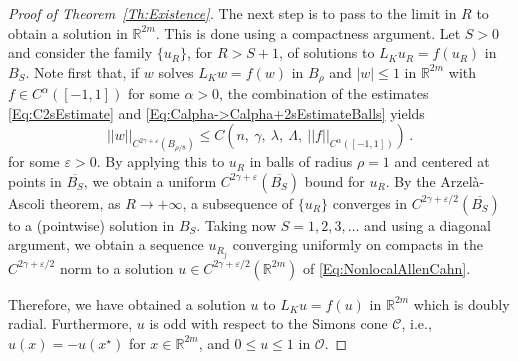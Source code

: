 \documentclass[12pt,reqno]{amsart}
\theoremstyle{definition}
\theoremstyle{remark}
\newcommand{\con}[1]{\mathbb{#1}}
\newcommand{\R}{\con{R}} %
\newcommand{\ccal}{\mathscr{C}}
\newcommand{\ocal}{\mathcal{O}}
\newcommand{\norm}[1]{\left | \left |{#1} \right | \right |}
\newcommand{\s}{\gamma}
\newcommand{\bpar}[1]{\left ( {#1}\right )}
\numberwithin{equation}{section}
\begin{document}
\begin{proof}[Proof of Theorem~\ref{Th:Existence}]
		The next step is to pass to the limit in $R$ to obtain a solution in $\R^{2m}$. This is done using a compactness argument. Let $S>0$ and consider the family $\{u_R\}$, for $R> S + 1$, of solutions to $L_K u_R = f(u_R)$ in $B_{S}$. Note first that, if $w$ solves $L_K w = f(w)$ in $B_\rho$ and  $|w|\leq 1$ in $\R^{2m}$ with $f\in C^{\alpha}([-1,1])$ for some $\alpha > 0$, the combination of the estimates \eqref{Eq:C2sEstimate} and \eqref{Eq:Calpha->Calpha+2sEstimateBalls} yields
		$$
		\norm{w}_{C^{2\s + \varepsilon}(B_{\rho/8})} \leq C \bpar{n,\ \s ,\ \lambda,\ \Lambda ,\ \norm{f}_{C^{\alpha}([-1,1])} }\,.
		$$
		for some $\varepsilon > 0$.  By applying this to $u_R$ in balls of radius $\rho = 1$ and centered at points in $\overline{B_{S}}$, we obtain a uniform $C^{2\s + \varepsilon}(\overline{B_S})$ bound for $u_R$. By the Arzelà-Ascoli theorem, as $R\to +\infty$, a subsequence of $\{u_R\}$ converges in $C^{2\s + \varepsilon/2}(\overline{B_S})$ to a (pointwise) solution in $B_S$. Taking now $S = 1,2,3,\ldots$ and using a diagonal argument, we obtain a sequence $u_{R_j}$ converging uniformly on compacts in the $C^{2\s + \varepsilon/2}$ norm to a solution $u \in C^{2\s + \varepsilon/2}(\R^{2m})$ of \eqref{Eq:NonlocalAllenCahn}.
		
		Therefore, we have obtained a solution $u$ to $L_K u = f(u)$ in $\R^{2m}$ which is doubly radial. Furthermore, $u$ is odd with respect to the Simons cone $\ccal$, i.e., $u(x) = -u(x^\star)$ for $x\in \R^{2m}$, and $0 \leq u\leq 1$ in $\ocal$.
		

\end{proof}
\end{document}
